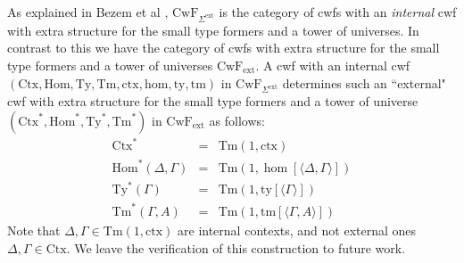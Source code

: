 \documentclass[11pt,a4paper]{article}
\theoremstyle{plain}
\theoremstyle{definition}
\newcommand{\id}{\mathsf{id}}
\newcommand{\Ctx}{\mathrm{Ctx}}
\newcommand{\Sub}{\mathrm{Hom}}
\newcommand{\Ty}{\mathrm{Ty}}
\newcommand{\Tm}{\mathrm{Tm}}
\def\sub{\mathrm{hom}}
\def\id{\mathrm{id}}
\newcommand{\ctx}{\mathrm{ctx}}
\newcommand{\ty}{\mathrm{ty}}
\newcommand{\tm}{\mathrm{tm}}
\newcommand{\tuple}[1]{\langle #1 \rangle}
\def\p{\mathrm{p}}
\def\CwF{\mathrm{CwF}}
\def\CwFext{\mathrm{CwF_{ext}}}
\def\Sigmaext{{\Sigma^\mathrm{ext}}}
\begin{document}
As explained in Bezem et al \cite{bezem:hofmann}, $\CwF_{\Sigmaext}$ is the category of cwfs with an {\em internal} cwf with extra structure for the small type formers and a tower of universes. In contrast to this we have the category of cwfs with extra structure for the small type formers and a tower of universes $\CwFext$. A cwf with an internal cwf $(\Ctx,\Sub,\Ty,\Tm,\ctx,\sub,\ty,\tm)$ in $\CwF_{\Sigmaext}$ determines such an ``external" cwf with extra structure for the small type formers and a tower of universe $(\Ctx^*,\Sub^*,\Ty^*,\Tm^*)$ in $\CwFext$ as follows:
\begin{eqnarray*}
\Ctx^* &=& \Tm(1,\ctx)\\
\Sub^*(\Delta,\Gamma) &=& \Tm(1,\hom[\tuple{\Delta,\Gamma}])\\
\Ty^*(\Gamma) &=& \Tm(1,\ty[\tuple{\Gamma}])\\
\Tm^*(\Gamma,A) &=& \Tm(1,\tm[\tuple{\Gamma,A}])
\end{eqnarray*} Note that $\Delta,\Gamma \in \Tm(1,\ctx)$ are internal contexts, and not external ones $\Delta,\Gamma \in \Ctx$. We leave the verification of this construction to future work.
%
\end{document}
